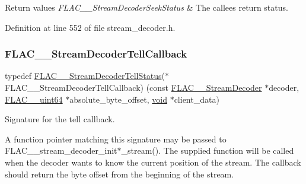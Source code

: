 \begin{DoxyRetVals}{Return values}
{\em F\+L\+A\+C\+\_\+\+\_\+\+Stream\+Decoder\+Seek\+Status} & The callee\textquotesingle{}s return status. \\
\hline
\end{DoxyRetVals}


Definition at line 552 of file stream\+\_\+decoder.\+h.

\mbox{\label{group__flac__stream__decoder_gafdf1852486617a40c285c0d76d451a5a}} 
\subsubsection{\texorpdfstring{FLAC\_\_StreamDecoderTellCallback}{FLAC\_\_StreamDecoderTellCallback}}
{\footnotesize\ttfamily typedef \mbox{\hyperlink{group__flac__stream__decoder_ga83708207969383bd7b5c1e9148528845}{F\+L\+A\+C\+\_\+\+\_\+\+Stream\+Decoder\+Tell\+Status}}($\ast$ F\+L\+A\+C\+\_\+\+\_\+\+Stream\+Decoder\+Tell\+Callback) (const \mbox{\hyperlink{struct_f_l_a_c_____stream_decoder}{F\+L\+A\+C\+\_\+\+\_\+\+Stream\+Decoder}} $\ast$decoder, \mbox{\hyperlink{ordinals_8h_aa78c8c70a3eb8a58af7436f278acde8e}{F\+L\+A\+C\+\_\+\+\_\+uint64}} $\ast$absolute\+\_\+byte\+\_\+offset, \mbox{\hyperlink{_s_d_l__opengles2__gl2ext_8h_ae5d8fa23ad07c48bb609509eae494c95}{void}} $\ast$client\+\_\+data)}

Signature for the tell callback.

A function pointer matching this signature may be passed to F\+L\+A\+C\+\_\+\+\_\+stream\+\_\+decoder\+\_\+init$\ast$\+\_\+stream(). The supplied function will be called when the decoder wants to know the current position of the stream. The callback should return the byte offset from the beginning of the stream.

